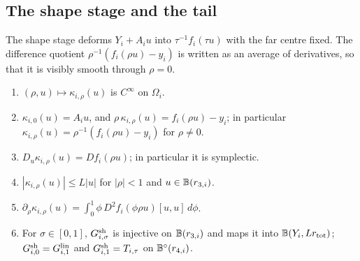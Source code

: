 \subsection{The shape stage and the tail}\label{sec:iso-shape}

The shape stage deforms $Y_i+A_iu$ into $\tau^{-1}f_i(\tau u)$ with the far centre fixed. The difference quotient
$\rho^{-1}(f_i(\rho u)-y_i)$ is written as an average of derivatives, so that it is visibly smooth through $\rho=0$.

\begin{lemma}\label{lem:iso-shape}
\begin{enumerate}[label=(\alph*)]
\item $(\rho,u)\mapsto\kappa_{i,\rho}(u)$ is $C^\infty$ on $\Omega_i$.
\item $\kappa_{i,0}(u)=A_iu$, and $\rho\,\kappa_{i,\rho}(u)=f_i(\rho u)-y_i$; in particular
 $\kappa_{i,\rho}(u)=\rho^{-1}(f_i(\rho u)-y_i)$ for $\rho\ne0$.
\item $D_u\kappa_{i,\rho}(u)=Df_i(\rho u)$; in particular it is symplectic.
\item $|\kappa_{i,\rho}(u)|\le L|u|$ for $|\rho|<1$ and $u\in\mathbb{B}(r_{3,i})$.
\item $\partial_\rho\kappa_{i,\rho}(u)=\int_0^1\phi\,D^2f_i(\phi\rho u)[u,u]\,d\phi$.
\item For $\sigma\in[0,1]$, $G^{\rm sh}_{i,\sigma}$ is injective on $\mathbb{B}(r_{3,i})$ and maps it into $\mathbb{B}(Y_i,Lr_{\rm tot})$;
 $G^{\rm sh}_{i,0}=G^{\rm lin}_{i,1}$ and $G^{\rm sh}_{i,1}=T_{i,\tau}$ on $\mathbb{B}^\circ(r_{4,i})$.
\end{enumerate}
\end{lemma}

